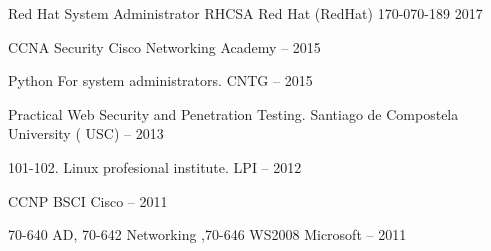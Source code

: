 \begin{cvhonors}
 \cvhonor
    {Red Hat System Administrator RHCSA} %
    {Red Hat (RedHat)} %
    {170-070-189} %
    {2017} %

  \cvhonor
    {CCNA Security} %
    {Cisco Networking Academy} %
    { -- } %
    {2015} %

  \cvhonor
    {Python For system administrators.} %
    {CNTG} %
    { -- } %
    {2015} %

  \cvhonor
  {Practical Web Security and Penetration Testing.} %
  {Santiago de Compostela University ( USC) } %
  { -- } %
  {2013} %
  
\cvhonor
  {101-102. Linux profesional institute.} %
  {LPI} %
  { -- } %
  {2012} %
  
  \cvhonor
    {CCNP BSCI} %
    {Cisco} %
    { -- } %
    {2011} %

  \cvhonor
    {70-640 AD, 70-642 Networking ,70-646 WS2008} %
    {Microsoft } %
    { -- } %
    {2011} %

\end{cvhonors}
